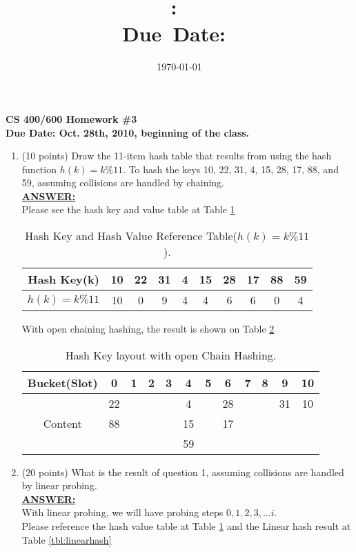 \documentclass{article}
\title{\textmd{\textbf{\hmwkClass:\
      \hmwkTitle}}\\\normalsize\small{Due\ Date:\
    \hmwkDueDate}\\}
\date{\today}
\author{\textsc{\hmwkAuthorName}}
\newcommand{\answer}{\textbf{\\\underline{ANSWER:}\\}}
\begin{document}
\begin{center}
\textbf{{\LARGE CS 400/600  Homework \#3} \\
Due Date: Oct. 28th, 2010, beginning of the class.}
\end{center}

\begin{enumerate}
\item(10 points) Draw the 11-item hash table that results from using
  the hash function $h(k)= k \% 11$. To hash the keys 10, 22, 31, 4,
  15, 28, 17, 88, and 59, assuming collisions are handled by
  chaining. 
\answer Please see the hash key and value table at Table
\ref{tbl:hashvalue}
\begin{table}[H]
  \begin{center}
    \begin{tabular}{|c|c|c|c|c|c|c|c|c|c|} 
      \hline Hash Key(k)&10&22&31&4&15&28&17&88&59 \\
      \hline $h(k)=k\%11$&10&0 &9 &4&4 &6 &6 &0 &4 \\
      \hline
    \end{tabular}
    \caption{Hash Key and Hash Value Reference
      Table($h(k)=k\%11$). \label{tbl:hashvalue}}  
    \vspace{-15pt}
  \end{center}
\end{table}
With open chaining hashing, the result is shown on Table
\ref{tbl:chainhash} \\ 

\begin{table}[H]
  \begin{center}
    \begin{tabular}{|c|c|c|c|c|c|c|c|c|c|c|c|} 
      \hline Bucket(Slot)&0&1&2&3&4&5&6&7&8&9&10 \\
      \hline 
      \multirow{3}{*}{Content} & 22& & & &4& & 28& & &31&10 \\
      &88& & & &15& & 17& & && \\
      && & & &59& & & & & &  \\
      \hline
    \end{tabular}
    \caption{Hash Key layout with open Chain
      Hashing. \label{tbl:chainhash}}
    \vspace{-15pt}
  \end{center}
\end{table}

\item(20 points) What is the result of question 1, assuming collisions
  are handled by linear probing.
\answer With linear probing, we will have probing steps $0, 1, 2, 3,
\ldots i$. \\
Please reference the hash value table at Table
\ref{tbl:hashvalue} and the Linear hash result at Table
\ref{tbl:linearhash} 


\end{enumerate}
\end{document}
